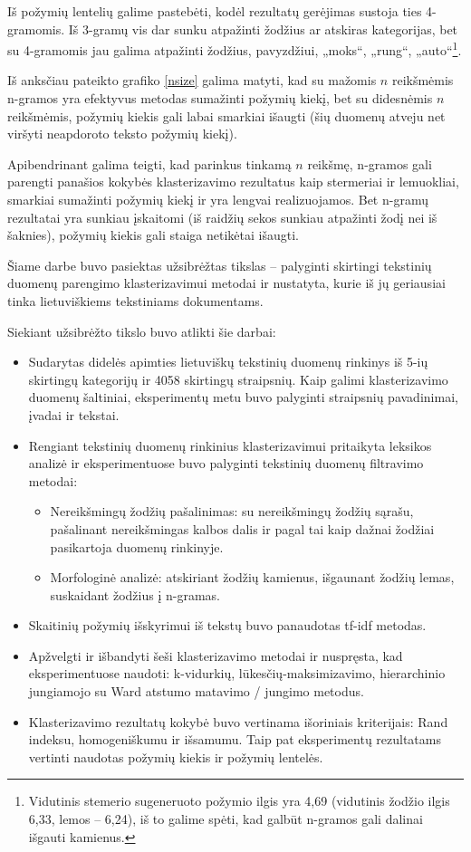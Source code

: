 \documentclass{VUMIFInfBakalaurinis}
\begin{document}
Iš požymių lentelių galime pastebėti, kodėl rezultatų gerėjimas sustoja
ties 4-gramomis. Iš 3-gramų vis dar sunku atpažinti žodžius ar atskiras
kategorijas, bet su 4-gramomis jau galima atpažinti žodžius, pavyzdžiui,
„moks“, „rung“, „auto“\footnote{Vidutinis stemerio sugeneruoto
  požymio ilgis yra 4,69 (vidutinis žodžio ilgis 6,33, lemos -- 6,24),
  iš to galime spėti, kad galbūt n-gramos gali dalinai išgauti kamienus.}.

Iš anksčiau pateikto grafiko \ref{nsize} galima
matyti, kad su mažomis $n$ reikšmėmis n-gramos yra efektyvus
metodas sumažinti požymių kiekį, bet su didesnėmis $n$ reikšmėmis,
požymių kiekis gali labai smarkiai išaugti (šių duomenų atveju net
viršyti neapdoroto teksto požymių kiekį).

Apibendrinant galima teigti, kad parinkus tinkamą $n$
reikšmę, n-gramos gali parengti panašios kokybės klasterizavimo
rezultatus kaip stermeriai ir lemuokliai, smarkiai sumažinti požymių
kiekį ir yra lengvai realizuojamos. Bet n-gramų rezultatai yra sunkiau
įskaitomi (iš raidžių sekos sunkiau atpažinti žodį nei iš šaknies),
požymių kiekis gali staiga netikėtai išaugti.

Šiame darbe buvo pasiektas užsibrėžtas tikslas -- palyginti skirtingi
tekstinių duomenų parengimo klasterizavimui metodai ir nustatyta, kurie
iš jų geriausiai tinka lietuviškiems tekstiniams dokumentams.

Siekiant užsibrėžto tikslo buvo atlikti šie darbai:

\begin{itemize}
\item
  Sudarytas didelės apimties lietuviškų tekstinių duomenų rinkinys iš
  5-ių skirtingų kategorijų ir 4058 skirtingų straipsnių. Kaip galimi
  klasterizavimo duomenų šaltiniai, eksperimentų metu buvo palyginti
  straipsnių pavadinimai, įvadai ir tekstai.
\item
  Rengiant tekstinių duomenų rinkinius klasterizavimui pritaikyta
  leksikos analizė ir eksperimentuose buvo palyginti tekstinių duomenų
  filtravimo metodai:

  \begin{itemize}
  \item
    Nereikšmingų žodžių pašalinimas: su nereikšmingų žodžių sąrašu,
    pašalinant nereikšmingas kalbos dalis ir pagal tai kaip dažnai žodžiai pasikartoja
    duomenų rinkinyje.
  \item
    Morfologinė analizė: atskiriant žodžių kamienus, išgaunant žodžių
    lemas, suskaidant žodžius į n-gramas.
  \end{itemize}
\item
  Skaitinių požymių išskyrimui iš tekstų buvo panaudotas tf-idf metodas.
\item
  Apžvelgti ir išbandyti šeši klasterizavimo metodai ir nuspręsta, kad
  eksperimentuose naudoti: k-vidurkių, lūkesčių-maksimizavimo,
  hierarchinio jungiamojo su Ward atstumo matavimo / jungimo metodus.
\item
  Klasterizavimo rezultatų kokybė buvo vertinama išoriniais kriterijais: Rand
  indeksu, homogeniškumu ir išsamumu. Taip pat eksperimentų rezultatams
  vertinti naudotas požymių kiekis ir požymių lentelės.
\end{itemize}
\end{document}
